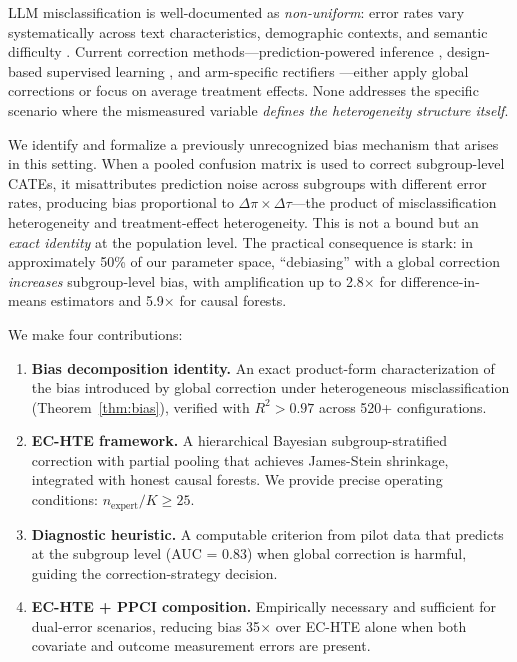 \documentclass[11pt,a4paper]{article}
\newcommand{\DeltaPi}{\Delta\pi}
\newcommand{\DeltaTau}{\Delta\tau}
\begin{document}
LLM misclassification is well-documented as \emph{non-uniform}: error rates vary systematically across text characteristics, demographic contexts, and semantic difficulty \citep{ashwin2025using,pangakis2023automated}.
Current correction methods---prediction-powered inference \citep[PPI;][]{angelopoulos2023prediction}, design-based supervised learning \citep[DSL;][]{egami2024using}, and arm-specific rectifiers \citep{mozer2026using}---either apply global corrections or focus on average treatment effects.
None addresses the specific scenario where the mismeasured variable \emph{defines the heterogeneity structure itself}.

We identify and formalize a previously unrecognized bias mechanism that arises in this setting.
When a pooled confusion matrix is used to correct subgroup-level CATEs, it misattributes prediction noise across subgroups with different error rates, producing bias proportional to $\DeltaPi \times \DeltaTau$---the product of misclassification heterogeneity and treatment-effect heterogeneity.
This is not a bound but an \emph{exact identity} at the population level.
The practical consequence is stark: in approximately 50\% of our parameter space, ``debiasing'' with a global correction \emph{increases} subgroup-level bias, with amplification up to 2.8$\times$ for difference-in-means estimators and 5.9$\times$ for causal forests.

We make four contributions:
\begin{enumerate}[nosep,leftmargin=*]
\item \textbf{Bias decomposition identity.} An exact product-form characterization of the bias introduced by global correction under heterogeneous misclassification (Theorem~\ref{thm:bias}), verified with $R^2 > 0.97$ across 520+ configurations.
\item \textbf{EC-HTE framework.} A hierarchical Bayesian subgroup-stratified correction with partial pooling that achieves James-Stein shrinkage, integrated with honest causal forests. We provide precise operating conditions: $n_{\text{expert}}/K \geq 25$.
\item \textbf{Diagnostic heuristic.} A computable criterion from pilot data that predicts at the subgroup level (AUC = 0.83) when global correction is harmful, guiding the correction-strategy decision.
\item \textbf{EC-HTE + PPCI composition.} Empirically necessary and sufficient for dual-error scenarios, reducing bias 35$\times$ over EC-HTE alone when both covariate and outcome measurement errors are present.
\end{enumerate}
\end{document}
